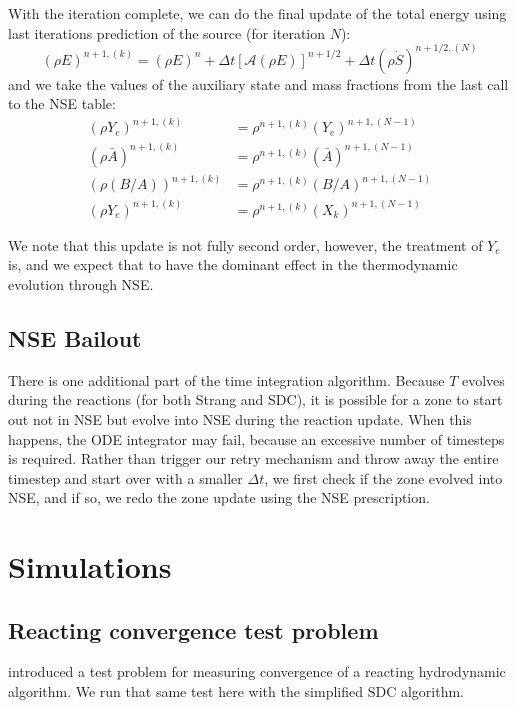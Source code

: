 \documentclass[times,modern]{aastex63}
\newcommand{\Sdot}{\dot{S}}
\newcommand{\Advss}[1]{{\left [{\mathcal{{A}}} \left(#1\right)\right]}}
\begin{document}
With the iteration complete, we can do the final update of the total energy using last iterations prediction of the source (for iteration $N$):
\begin{equation}
(\rho E)^{n+1,(k)} = (\rho E)^n + \Delta t \Advss{\rho E}^{n+1/2} + \Delta t (\rho \Sdot)^{n+1/2,(N)}
\end{equation}
and we take the values of the auxiliary state and mass fractions from the last call to the NSE table:
\begin{align}
(\rho Y_e)^{n+1,(k)} &= \rho^{n+1,(k)} (Y_e)^{n+1,(N-1)} \\
(\rho \bar{A})^{n+1,(k)} &= \rho^{n+1,(k)} (\bar{A})^{n+1,(N-1)} \\
(\rho (B/A))^{n+1,(k)} &= \rho^{n+1,(k)} (B/A)^{n+1,(N-1)} \\
(\rho Y_e)^{n+1,(k)} &= \rho^{n+1,(k)} (X_k)^{n+1,(N-1)}
\end{align}

We note that this update is not fully second order, however, the
treatment of $Y_e$ is, and we expect that to have the dominant effect
in the thermodynamic evolution through NSE.

\subsection{NSE Bailout}

There is one additional part of the time integration algorithm.
Because $T$ evolves during the reactions (for both Strang and SDC), it
is possible for a zone to start out not in NSE but evolve into NSE
during the reaction update.  When this happens, the ODE integrator may
fail, because an excessive number of timesteps is required.  Rather
than trigger our retry mechanism and throw away the entire timestep
and start over with a smaller $\Delta t$, we first check if the zone
evolved into NSE, and if so, we redo the zone update using the NSE
prescription.

\section{Simulations}

\subsection{Reacting convergence test problem}

\cite{castro_sdc} introduced a test problem for measuring convergence
of a reacting hydrodynamic algorithm.  We run that same test here with the
simplified SDC algorithm.
\end{document}

